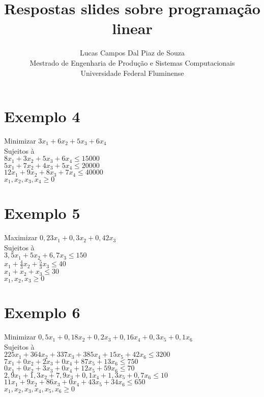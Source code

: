 \documentclass[a4paper,oneside]{article}
\title{Respostas slides sobre programação linear}
\author{Lucas Campos Dal Piaz de Souza \\
Mestrado de Engenharia de Produção e Sistemas Computacionais\\

Universidade Federal Fluminense

}
\begin{document}

\maketitle




\section*{Exemplo 4}
\begin{center}
    Minimizar  $3x_1 + 6x_2 + 5x_3 + 6x_4$ \\
    Sujeitos à \\
  $8x_1 + 3x_2 + 5x_3 + 6x_4 \leq 15000$ \\
  $5x_1 + 7x_2 + 4x_3 + 5x_4 \leq 20000$ \\
  $12x_1 + 9x_2 + 8x_3 + 7x_4 \leq 40000$ \\
  $x_1, x_2, x_3, x_4 \geq 0$\\
\end{center}

\section*{Exemplo 5}
\begin{center}
    Maximizar  $0,23x_1 + 0,3x_2 + 0,42x_3 $ \\
    Sujeitos à \\
  $3,5x_1 + 5x_2 + 6,7x_3 \leq 150$ \\
  $x_1 + \frac{4}{3}x_2 + \frac{5}{3}x_3 \leq 40$ \\
  $x_1 + x_2 + x_3 \leq 30$ \\
  $x_1, x_2, x_3 \geq 0$\\
\end{center}

\section*{Exemplo 6}

\begin{center}
  Minimizar  $0,5x_1 + 0,18x_2 + 0,2x_3 + 0,16x_4 + 0,3x_5 + 0,1x_6$ \\
  Sujeitos à \\
  $225x_1 + 364x_2 + 337x_3 + 385x_4 + 15x_5 + 42x_6 \leq 3200$ \\
  $7x_1 + 0x_2 + 2x_3 + 0x_4 + 87x_5 + 13x_6 \leq 750$ \\
  $0x_1 + 0x_2 + 3x_3 + 0x_4 + 12x_5 + 59x_6 \leq 70$ \\
  $2,9x_1 + 1,3x_2 + 7,9x_3 + 0,1x_4 + 1,3x_5 + 0,7x_6 \leq 10$ \\
  $11x_1 + 9x_2 + 86x_3 + 0x_4 + 43x_5 + 34x_6 \leq 650$ \\
  $x_1, x_2, x_3, x_4, x_5, x_6 \geq 0$\\
  
    
\end{center}
\end{document}
